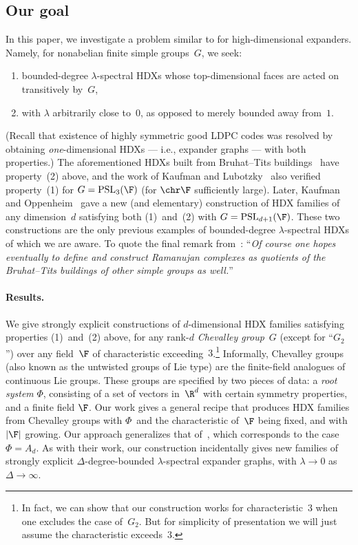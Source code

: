 \documentclass[11pt]{article}
\newcommand{\rnote}[1]{}
\newcommand{\PSL}{{\mathrm{PSL}}}
\begin{document}
\subsection{Our goal}   \label{sec:goal}
In this paper, we investigate a problem similar to  for high-dimensional expanders.
Namely, for nonabelian finite simple groups~$G$, we seek:
\begin{enumerate}
    \item bounded-degree $\lambda$-spectral HDXs whose top-dimensional faces are acted on transitively by~$G$,
    \item with $\lambda$ arbitrarily close to~$0$, as opposed to merely bounded away from~$1$.
\end{enumerate}
(Recall that existence of highly symmetric good LDPC codes was resolved by obtaining \emph{one}-dimensional HDXs --- i.e., expander graphs --- with both properties.)
The aforementioned HDXs built from Bruhat--Tits buildings~\cite{Li04,LSV05,LSV05b,Sar04} have property~(2) above, and the work of Kaufman and Lubotzky~\cite{KL12} also verified property~(1) for $G = \PSL_3(\F)$ (for  $\chr \F$ sufficiently large).
Later, Kaufman and Oppenheim~\cite{KO18} gave a new (and elementary) construction of HDX families of any dimension~$d$ satisfying both (1)~and~(2) with $G = \PSL_{d+1}(\F)$.
These two constructions are the only previous examples of bounded-degree $\lambda$-spectral HDXs of which we are aware.  To quote the final remark from~\cite{LSV05}: ``\emph{Of course one hopes eventually to define and construct Ramanujan complexes as quotients of the Bruhat--Tits buildings of other simple groups as well.}''

\paragraph{Results.}
We give strongly explicit constructions of $d$-dimensional HDX families satisfying properties (1)~and~(2) above, for any rank-$d$ \emph{Chevalley group}~$G$ (except for ``$G_2$'') over any field~$\F$ of characteristic exceeding~$3$.\footnote{In fact, we can show that our construction works for characteristic~$3$ when one excludes the case of~$G_2$.  But for simplicity of presentation we will just assume the characteristic exceeds~$3$.\label{foot:5}}
Informally, Chevalley groups (also known as the untwisted groups of Lie type) are the finite-field analogues of continuous Lie groups.
These groups are specified by two pieces of data: a \emph{root system} $\Phi$, consisting of a set of vectors in~$\R^d$ with certain symmetry properties, and a finite field $\F$.
Our work gives a general recipe that produces HDX families from Chevalley groups with $\Phi$~and the characteristic of~$\F$ being fixed, and with $|\F|$ growing.
Our approach generalizes that of~\cite{KO18}, which corresponds to the case $\Phi = A_d$.
As with their work, our construction incidentally gives new families of strongly explicit $\Delta$-degree-bounded $\lambda$-spectral expander graphs, with $\lambda \to 0$ as $\Delta \to \infty$.\rnote{Some comments about graphs of constant link?}
\end{document}
